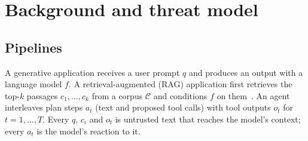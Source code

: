 \documentclass[review,12pt]{elsarticle}
\begin{document}
\section{Background and threat model}\label{sec:threat}
\subsection{Pipelines}
A generative application receives a user prompt $q$ and produces an output with a language model $f$. A
retrieval-augmented (RAG) application first retrieves the top-$k$ passages $c_1,\dots,c_k$ from a corpus
$\mathcal{C}$ and conditions $f$ on them~\cite{gao2023rag}. An agent interleaves plan steps $a_t$ (text and
proposed tool calls) with tool outputs $o_t$ for $t=1,\dots,T$. Every $q$, $c_i$ and $o_t$ is untrusted text
that reaches the model's context; every $a_t$ is the model's reaction to it.
\end{document}
